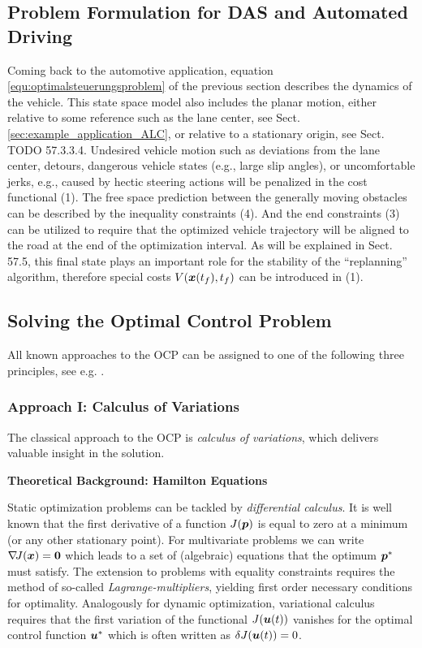 \subsection{Problem Formulation for DAS and Automated Driving}
Coming back to the automotive application, equation \eqref{equ:optimalsteuerungsproblem} of the previous section describes the dynamics of the vehicle. This state space model also includes the planar motion, either relative to some reference such as the lane center, see Sect. \ref{sec:example_application_ALC}, or relative to a stationary origin, see Sect. TODO 57.3.3.4. Undesired vehicle motion such as deviations from the lane center, detours, dangerous vehicle states (e.g., large slip angles), or uncomfortable jerks, e.g., caused by hectic steering actions will be penalized in the cost functional (1). The free space prediction between the generally moving obstacles can be described by the inequality constraints (4). And the end constraints (3) can be utilized to require that the optimized vehicle trajectory will be aligned to the road at the end of the optimization interval. As will be explained in Sect. 57.5, this final state plays an important role for the stability of the “replanning” algorithm, therefore special costs 
$V(\boldsymbol{x}(t_f), t_f)$ can be introduced in (1). 

\subsection{Solving the Optimal Control Problem}
All known approaches to the OCP can be assigned to one of the following three principles, see e.g. \cite{diehl_fast_multipleshooting}.
\subsubsection{Approach I: Calculus of Variations}
The classical approach to the OCP is \textit{calculus of variations}, which delivers valuable insight in the solution. 

\textbf{Theoretical Background: Hamilton Equations}

Static optimization problems can be tackled by \textit{differential calculus}. It is well known that the first derivative of a function $J(\boldsymbol{p})$  is equal to zero at a minimum (or any other stationary point). For multivariate problems we can write $\nabla\!J(\boldsymbol{x}) = \boldsymbol{0}$
which leads to a set of (algebraic) equations that the optimum 
$\boldsymbol{p}^\ast$ must satisfy. The extension to problems with equality constraints requires the method of so-called \textit{Lagrange-multipliers}, yielding first order necessary conditions for optimality.
Analogously for dynamic optimization, variational calculus requires that the first variation of the functional $J(\boldsymbol{u}(t))$
vanishes for the optimal control function $\boldsymbol{u}^\ast$
which is often written as $\delta J(\boldsymbol{u}(t))=0$. 

